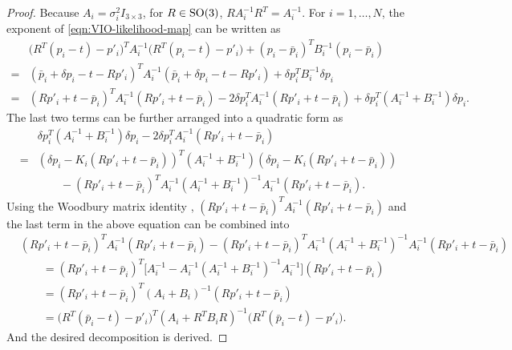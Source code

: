 \begin{proof}
	Because $A_i = \sigma_i^2I_{3\times 3}$, for $R\in\mathrm{SO}(3)$, $RA_i^{-1}R^T = A_i^{-1}$.
	For $i=1,\ldots,N$, the exponent of \eqref{eqn:VIO-likelihood-map} can be written as
	\begin{align*}
		&\big(R^T(p_i-t)-p'_i\big)^T A_i^{-1} \big(R^T(p_i-t)-p'_i\big) + (p_i-\bar{p}_i)^T B_i^{-1} (p_i-\bar{p}_i) \\
		= &(\bar{p}_i+\delta p_i - t - Rp'_i)^T A_i^{-1} (\bar{p}_i+\delta p_i - t - Rp'_i) + \delta p_i^T B_i^{-1} \delta p_i \\
		= &(Rp'_i+t-\bar{p}_i)^T A_i^{-1} (Rp'_i+t-\bar{p}_i) - 2\delta p_i^T A_i^{-1} (Rp'_i+t-\bar{p}_i) + \delta p_i^T (A_i^{-1}+B_i^{-1}) \delta p_i.
	\end{align*}
	The last two terms can be further arranged into a quadratic form as
	\begin{align*}
		&\delta p_i^T (A_i^{-1}+B_i^{-1}) \delta p_i - 2\delta p_i^T A_i^{-1} (Rp'_i+t-\bar{p}_i) \\
		= &\left( \delta p_i - K_i(Rp'_i+t-\bar{p}_i) \right)^T (A_i^{-1}+B_i^{-1}) \left( \delta p_i - K_i(Rp'_i+t-\bar{p}_i) \right) \\
		&\qquad - (Rp'_i+t-\bar{p}_i)^T A_i^{-1} (A_i^{-1}+B_i^{-1})^{-1} A_i^{-1} (Rp'_i+t-\bar{p}_i).
	\end{align*}
	Using the Woodbury matrix identity \cite{petersen2008matrix}, $(Rp'_i+t-\bar{p}_i)^T A_i^{-1} (Rp'_i+t-\bar{p}_i)$ and the last term in the above equation can be combined into
	\begin{align*}
		&(Rp'_i+t-\bar{p}_i)^T A_i^{-1} (Rp'_i+t-\bar{p}_i) - (Rp'_i+t-\bar{p}_i)^T A_i^{-1} (A_i^{-1}+B_i^{-1})^{-1} A_i^{-1} (Rp'_i+t-\bar{p}_i) \\
		&\qquad = (Rp'_i+t-\bar{p}_i)^T \Big[ A_i^{-1} - A_i^{-1} (A_i^{-1}+B_i^{-1})^{-1} A_i^{-1} \Big] (Rp'_i+t-\bar{p}_i) \\
		&\qquad = (Rp'_i+t-\bar{p}_i)^T (A_i+B_i)^{-1} (Rp'_i+t-\bar{p}_i) \\
		&\qquad = \big(R^T(\bar{p}_i-t)-p'_i\big)^T (A_i+R^TB_iR)^{-1} \big(R^T(\bar{p}_i-t)-p'_i\big).
	\end{align*}
	And the desired decomposition is derived.
\end{proof}

